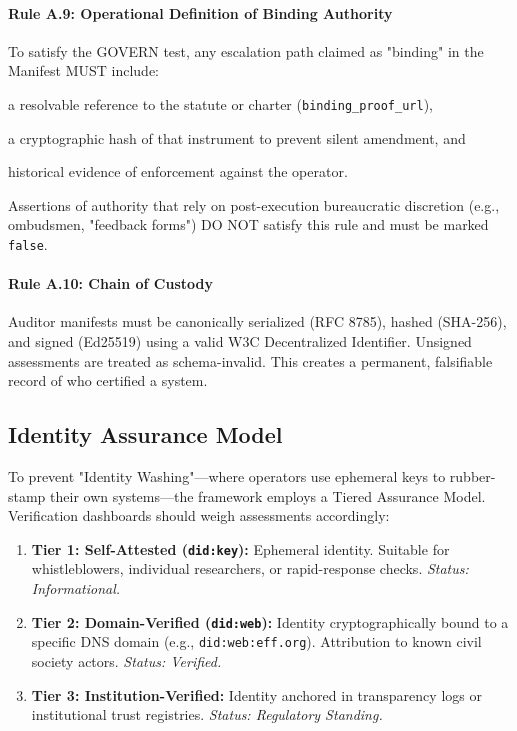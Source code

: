 \documentclass{article}
\begin{document}
\paragraph{Rule A.9: Operational Definition of Binding Authority}
To satisfy the GOVERN test, any escalation path claimed as "binding" in the Manifest MUST include:
\begin{enumerate*}[label=(\roman*)]
    \item a resolvable reference to the statute or charter (\texttt{binding\_proof\_url}),
    \item a cryptographic hash of that instrument to prevent silent amendment, and
    \item historical evidence of enforcement against the operator.
\end{enumerate*}
Assertions of authority that rely on post-execution bureaucratic discretion (e.g., ombudsmen, "feedback forms") DO NOT satisfy this rule and must be marked \texttt{false}.

\paragraph{Rule A.10: Chain of Custody}
Auditor manifests must be canonically serialized (RFC 8785), hashed (SHA-256), and signed (Ed25519) using a valid W3C Decentralized Identifier. Unsigned assessments are treated as schema-invalid. This creates a permanent, falsifiable record of who certified a system.

\subsection{Identity Assurance Model}

To prevent "Identity Washing"---where operators use ephemeral keys to rubber-stamp their own systems---the framework employs a Tiered Assurance Model. Verification dashboards should weigh assessments accordingly:

\begin{enumerate}
    \item \textbf{Tier 1: Self-Attested (\texttt{did:key}):} Ephemeral identity. Suitable for whistleblowers, individual researchers, or rapid-response checks. \textit{Status: Informational.}
    \item \textbf{Tier 2: Domain-Verified (\texttt{did:web}):} Identity cryptographically bound to a specific DNS domain (e.g., \texttt{did:web:eff.org}). Attribution to known civil society actors. \textit{Status: Verified.}
    \item \textbf{Tier 3: Institution-Verified:} Identity anchored in transparency logs or institutional trust registries. \textit{Status: Regulatory Standing.}
\end{enumerate}
\end{document}
